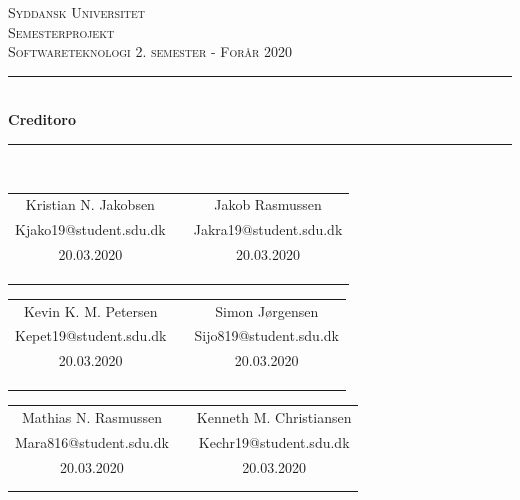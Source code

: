 \begin{titlepage}
\begin{center}
\textsc{\LARGE Syddansk Universitet }\\[0.8cm]

\textsc{Semesterprojekt}\\[0.5cm]

\textsc{\large Softwareteknologi 2. semester - Forår 2020}\\[0.5cm]
\rule{\linewidth}{0.5mm}\\[0.4cm]
{ \LARGE \bfseries Creditoro \\[0.4cm]}
\rule{\linewidth}{0.5mm}\\[1.2cm]

\begin{table}
\begin{tabular}{c c c}
	Kristian N. Jakobsen     &   & Jakob Rasmussen\\ 
	Kjako19@student.sdu.dk   &   & Jakra19@student.sdu.dk \\
	20.03.2020               &   & 20.03.2020 \\
    \\ \\
        	\cline{1-1}\cline{3-3}

        	\\
\end{tabular}
\label{authors:kjako19}
\end{table}

\begin{tabular}{c c c} 
	Kevin K. M. Petersen     &   & Simon Jørgensen \\ 
	Kepet19@student.sdu.dk   &   & Sijo819@student.sdu.dk\\
	20.03.2020               &   & 20.03.2020\\
    \\ \\
        	\cline{1-1}\cline{3-3}

        	\\
\end{tabular}
\begin{tabular}{c c c} 
	Mathias N. Rasmussen     &   & Kenneth M. Christiansen\\ 
	Mara816@student.sdu.dk   &   & Kechr19@student.sdu.dk \\
	20.03.2020               &   & 20.03.2020 \\
    \\ \\
        	\cline{1-1}\cline{3-3}


\end{tabular}
\end{center}
\end{titlepage}
